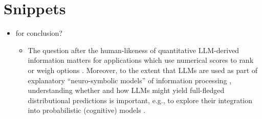 \documentclass[fleqn]{article}
\begin{document}
\section*{Snippets}

\begin{itemize}
  \item for conclusion?
  \begin{itemize}
    \item The question after the human-likeness of quantitative LLM-derived information matters for applications which use numerical scores to rank or weigh options \citep[e.g.,][]{ParkOBrien2023:Generative-Agen,ZhangLehman2023:OMNI:-Open-ende}.
    Moreover, to the extent that LLMs are used as part of explanatory ``neuro-symbolic models'' of information processing \citep{GarcezLamb2020:Neurosymbolic-A}, understanding whether and how LLMs might yield full-fledged distributional predictions is important, e.g., to explore their integration into probabilistic (cognitive) models \citep[c.f.,][]{Frank2023:Large-language-}.
  \end{itemize}
\end{itemize}
\end{document}
